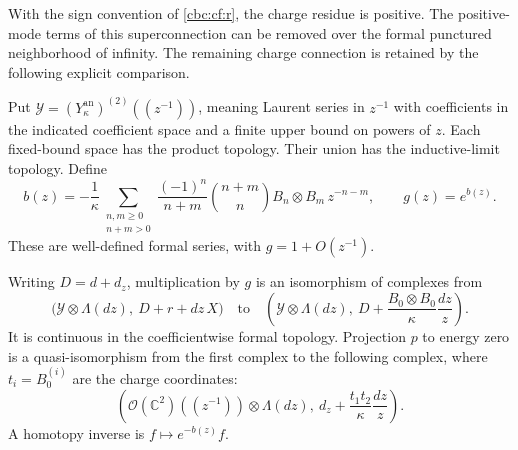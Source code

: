 With the sign convention of \eqref{cbc:cf:r}, the charge residue is
positive. The positive-mode terms of this superconnection can be removed over
the formal punctured neighborhood of infinity. The remaining charge
connection is retained by the following explicit comparison.

\begin{proposition}\label{cbc:rc:an:prop:gauge}
Put \(\mathscr Y=(Y^{\mathrm{an}}_\kappa)^{(2)}((z^{-1}))\), meaning
Laurent series in \(z^{-1}\) with coefficients in the indicated
coefficient space and a finite upper bound on powers of \(z\).
Each fixed-bound space has the product topology. Their union has the
inductive-limit topology. Define
\begin{equation}\label{cbc:rc:an:eq:gauge}
 b(z)=-\frac1\kappa\sum_{\substack{n,m\geq0\\n+m>0}}
       \frac{(-1)^n}{n+m}\binom{n+m}{n}
       B_n\otimes B_m\,z^{-n-m},\qquad g(z)=e^{b(z)}.
\end{equation}
These are well-defined formal series, with \(g=1+O(z^{-1})\).

Writing \(D=d+d_z\), multiplication by \(g\) is an isomorphism
of complexes from
\[
 \bigl(\mathscr Y\otimes\Lambda(dz),\ D+r+dz\,X\bigr)
 \quad\text{to}\quad
 \left(\mathscr Y\otimes\Lambda(dz),\
 D+\frac{B_0\otimes B_0}{\kappa}\frac{dz}{z}\right).
\]
It is continuous in the coefficientwise formal topology. Projection
\(p\) to energy zero is a quasi-isomorphism from the first complex to
the following complex, where \(t_i=B_0^{(i)}\) are the charge
coordinates:
\begin{equation}\label{cbc:rc:an:eq:charge-complex}
 \left(\mathcal O(\mathbb C^2)((z^{-1}))\otimes\Lambda(dz),\
 d_z+\frac{t_1t_2}{\kappa}\frac{dz}{z}\right).
\end{equation}
A homotopy inverse is \(f\mapsto e^{-b(z)}f\).
\end{proposition}
